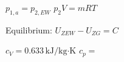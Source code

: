 \( p_{1,a} = p_{2,EW} \)  
\( p_{2} V = mRT \)  

Equilibrium:  
\( U_{ZEW} - U_{ZG} = C \)  

\( c_V = 0.633 \, \text{kJ/kg·K} \)  
\( c_p = \)